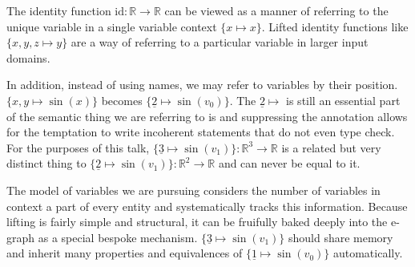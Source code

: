 \documentclass{article}%
\newcommand{\bR}{\mathbb{R}}
\newcommand{\lift}{\text{lift}}
\begin{document}

The identity function $\text{id} : \bR \rightarrow \bR$ can be viewed as a manner of referring to the unique variable in a single variable context $\{ x \mapsto x \}$. Lifted identity functions like $\{ x,y,z \mapsto y \}$ are a way of referring to a particular variable in larger input domains.

In addition, instead of using names, we may refer to variables by their position. $\{ x,y \mapsto \sin(x) \}$ becomes $\{ \underline{2} \mapsto \sin(v_0) \}$. The $\underline{2} \mapsto$ is still an essential part of the semantic thing we are referring to is and suppressing the annotation allows for the temptation to write incoherent statements that do not even type check. For the purposes of this talk, $\{\underline{3} \mapsto \sin(v_1) \} : \bR^3 \rightarrow \bR$ is a related but very distinct thing to $\{ \underline{2} \mapsto \sin(v_1) \} : \bR^2 \rightarrow \bR $ and can never be equal to it.


The model of variables we are pursuing considers the number of variables in context a part of every entity and systematically tracks this information. Because lifting is fairly simple and structural, it can be fruifully baked deeply into the e-graph as a special bespoke mechanism. $\{\underline{3} \mapsto \sin(v_1) \}$ should share memory and inherit many properties and equivalences of $\{ \underline{1} \mapsto \sin(v_0) \}$ automatically.



\end{document}
